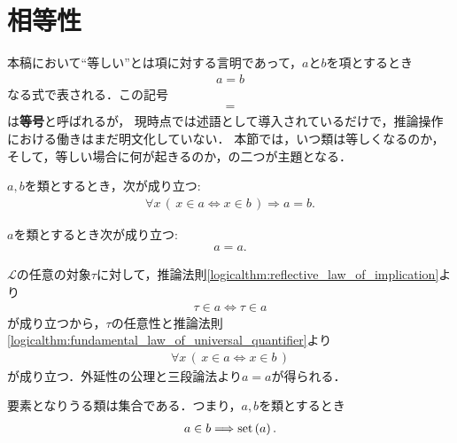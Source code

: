 \section{相等性}
	本稿において``等しい''とは項に対する言明であって，$a$と$b$を項とするとき
	\begin{align}
		a = b
	\end{align}
	なる式で表される．この記号
	\begin{align}
		=
	\end{align}
	は{\bf 等号}と呼ばれるが，
	現時点では述語として導入されているだけで，推論操作における働きはまだ明文化していない．
	本節では，いつ類は等しくなるのか，そして，等しい場合に何が起きるのか，の二つが主題となる．
	
	\begin{screen}
		\begin{axm}[外延性の公理]
			$a,b$を類とするとき，次が成り立つ:
			\begin{align}
				\forall x\, (\, x \in a  \Longleftrightarrow x \in b\, )
				\Longrightarrow a=b.
			\end{align}
		\end{axm}
	\end{screen}
	
	\begin{screen}
		\begin{thm}[任意の類は自分自身と等しい]\label{thm:any_class_equals_to_itself}
			$a$を類とするとき次が成り立つ:
			\begin{align}
				a = a.
			\end{align}
		\end{thm}
	\end{screen}
	
	\begin{prf}
		$\mathcal{L}$の任意の対象$\tau$に対して，推論法則\ref{logicalthm:reflective_law_of_implication}より
		\begin{align}
			\tau \in a \Longleftrightarrow \tau \in a
		\end{align}
		が成り立つから，$\tau$の任意性と推論法則\ref{logicalthm:fundamental_law_of_universal_quantifier}より
		\begin{align}
			\forall x\, (\, x \in a  \Longleftrightarrow x \in b\, )
		\end{align}
		が成り立つ．外延性の公理と三段論法より$a = a$が得られる．
		\QED
	\end{prf}
	
	\begin{screen}
		\begin{axm}[要素の公理]
			要素となりうる類は集合である．つまり，$a,b$を類とするとき
			\begin{align}
				a \in b \Longrightarrow \operatorname*{set} \left(a\right).
			\end{align}
		\end{axm}
	\end{screen}
	
